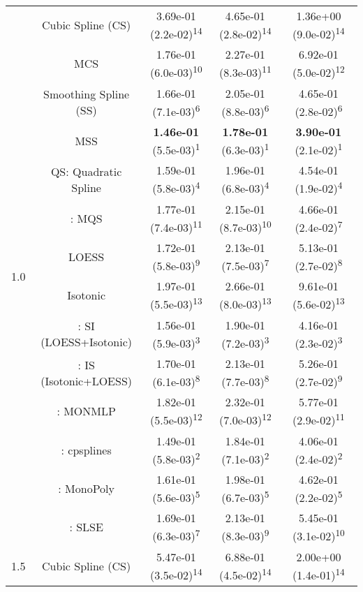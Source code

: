 \begin{tabular}{ccccc}
\multirow{14}{*}{1.0}&Cubic Spline (CS)& 3.69e-01 (2.2e-02)\textsuperscript{14}& 4.65e-01 (2.8e-02)\textsuperscript{14}& 1.36e+00 (9.0e-02)\textsuperscript{14}\tabularnewline
&MCS& 1.76e-01 (6.0e-03)\textsuperscript{10}& 2.27e-01 (8.3e-03)\textsuperscript{11}& 6.92e-01 (5.0e-02)\textsuperscript{12}\tabularnewline
&Smoothing Spline (SS)& 1.66e-01 (7.1e-03)\textsuperscript{6}& 2.05e-01 (8.8e-03)\textsuperscript{6}& 4.65e-01 (2.8e-02)\textsuperscript{6}\tabularnewline
&MSS& \textbf{1.46e-01} (5.5e-03)\textsuperscript{1}& \textbf{1.78e-01} (6.3e-03)\textsuperscript{1}& \textbf{3.90e-01} (2.1e-02)\textsuperscript{1}\tabularnewline
&QS: Quadratic Spline& 1.59e-01 (5.8e-03)\textsuperscript{4}& 1.96e-01 (6.8e-03)\textsuperscript{4}& 4.54e-01 (1.9e-02)\textsuperscript{4}\tabularnewline
&\textcite{heMonotoneBsplineSmoothing1998}: MQS& 1.77e-01 (7.4e-03)\textsuperscript{11}& 2.15e-01 (8.7e-03)\textsuperscript{10}& 4.66e-01 (2.4e-02)\textsuperscript{7}\tabularnewline
&LOESS& 1.72e-01 (5.8e-03)\textsuperscript{9}& 2.13e-01 (7.5e-03)\textsuperscript{7}& 5.13e-01 (2.7e-02)\textsuperscript{8}\tabularnewline
&Isotonic& 1.97e-01 (5.5e-03)\textsuperscript{13}& 2.66e-01 (8.0e-03)\textsuperscript{13}& 9.61e-01 (5.6e-02)\textsuperscript{13}\tabularnewline
&\textcite{mammenEstimatingSmoothMonotone1991}: SI (LOESS+Isotonic)& 1.56e-01 (5.9e-03)\textsuperscript{3}& 1.90e-01 (7.2e-03)\textsuperscript{3}& 4.16e-01 (2.3e-02)\textsuperscript{3}\tabularnewline
&\textcite{mammenEstimatingSmoothMonotone1991}: IS (Isotonic+LOESS)& 1.70e-01 (6.1e-03)\textsuperscript{8}& 2.13e-01 (7.7e-03)\textsuperscript{8}& 5.26e-01 (2.7e-02)\textsuperscript{9}\tabularnewline
&\textcite{cannonMonmlpMultilayerPerceptron2017}: MONMLP& 1.82e-01 (5.5e-03)\textsuperscript{12}& 2.32e-01 (7.0e-03)\textsuperscript{12}& 5.77e-01 (2.9e-02)\textsuperscript{11}\tabularnewline
&\textcite{navarro-garciaConstrainedSmoothingOutofrange2023}: cpsplines& 1.49e-01 (5.8e-03)\textsuperscript{2}& 1.84e-01 (7.1e-03)\textsuperscript{2}& 4.06e-01 (2.4e-02)\textsuperscript{2}\tabularnewline
&\textcite{murrayFastFlexibleMethods2016a}: MonoPoly& 1.61e-01 (5.6e-03)\textsuperscript{5}& 1.98e-01 (6.7e-03)\textsuperscript{5}& 4.62e-01 (2.2e-02)\textsuperscript{5}\tabularnewline
&\textcite{groeneboomConfidenceIntervalsMonotone2023}: SLSE& 1.69e-01 (6.3e-03)\textsuperscript{7}& 2.13e-01 (8.3e-03)\textsuperscript{9}& 5.45e-01 (3.1e-02)\textsuperscript{10}\tabularnewline
\midrule
\multirow{14}{*}{1.5}&Cubic Spline (CS)& 5.47e-01 (3.5e-02)\textsuperscript{14}& 6.88e-01 (4.5e-02)\textsuperscript{14}& 2.00e+00 (1.4e-01)\textsuperscript{14}\tabularnewline

\end{tabular}
